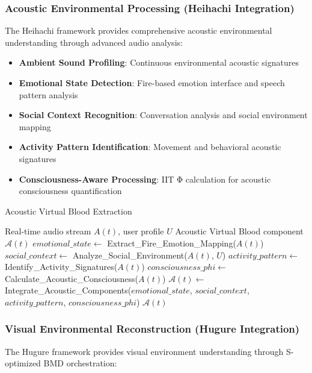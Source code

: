 \documentclass[12pt,a4paper]{article}
\begin{document}
\subsubsection{Acoustic Environmental Processing (Heihachi Integration)}

The Heihachi framework provides comprehensive acoustic environmental understanding through advanced audio analysis:

\begin{itemize}
\item \textbf{Ambient Sound Profiling}: Continuous environmental acoustic signatures
\item \textbf{Emotional State Detection}: Fire-based emotion interface and speech pattern analysis  
\item \textbf{Social Context Recognition}: Conversation analysis and social environment mapping
\item \textbf{Activity Pattern Identification}: Movement and behavioral acoustic signatures
\item \textbf{Consciousness-Aware Processing}: IIT Φ calculation for acoustic consciousness quantification
\end{itemize}

\begin{algorithm}
\caption{Acoustic Virtual Blood Extraction}
\begin{algorithmic}[1]
\REQUIRE Real-time audio stream $A(t)$, user profile $U$
\ENSURE Acoustic Virtual Blood component $\mathcal{A}(t)$
\STATE $emotional\_state \leftarrow$ Extract\_Fire\_Emotion\_Mapping($A(t)$)
\STATE $social\_context \leftarrow$ Analyze\_Social\_Environment($A(t)$, $U$)
\STATE $activity\_pattern \leftarrow$ Identify\_Activity\_Signatures($A(t)$)
\STATE $consciousness\_phi \leftarrow$ Calculate\_Acoustic\_Consciousness($A(t)$)
\STATE $\mathcal{A}(t) \leftarrow$ Integrate\_Acoustic\_Components($emotional\_state$, $social\_context$, $activity\_pattern$, $consciousness\_phi$)
\RETURN $\mathcal{A}(t)$
\end{algorithmic}
\end{algorithm}

\subsubsection{Visual Environmental Reconstruction (Hugure Integration)}

The Hugure framework provides visual environment understanding through S-optimized BMD orchestration:
\end{document}
